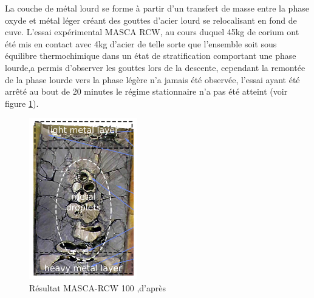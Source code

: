 La couche de métal lourd se forme à partir d'un transfert de masse entre la phase oxyde et métal léger créant des gouttes d'acier lourd se relocalisant en fond de cuve. L'essai expérimental MASCA RCW, au cours duquel 45kg de corium ont été mis en contact avec 4kg d'acier de telle sorte que l'ensemble soit sous équilibre thermochimique dans un état de stratification comportant une phase lourde,a permis d'observer les gouttes lors de la descente, cependant la remontée de la phase lourde vers la phase légère n'a jamais été observée, l'essai ayant été arrêté au bout de 20 minutes le régime stationnaire n'a pas été atteint (voir figure \ref{fig:masca}).
 \begin{figure}[H]
	\centering
	\includegraphics[width=0.3\linewidth]{figure/MASCA_RCW.png}
	\caption[Résultat MASCA-RCW 100]{Résultat MASCA-RCW 100 ,d'après \cite{tellier_interfaces_2019}}
	\label{fig:masca}
\end{figure}



